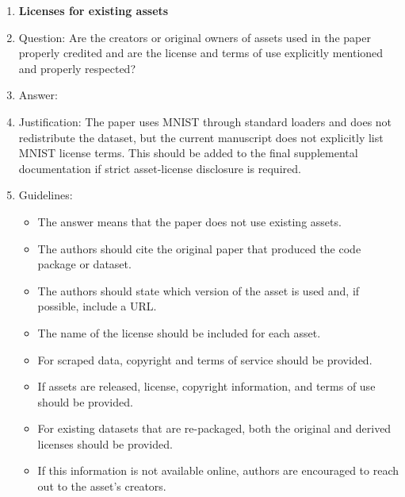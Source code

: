 \documentclass{article}
\begin{document}
\begin{enumerate}[leftmargin=1.5em]
\item {\bf Licenses for existing assets}
    \item[] Question: Are the creators or original owners of assets used in the paper properly credited and are the license and terms of use explicitly mentioned and properly respected?
    \item[] Answer: \answerNo{}
    \item[] Justification: The paper uses MNIST through standard loaders and does not redistribute the dataset, but the current manuscript does not explicitly list MNIST license terms. This should be added to the final supplemental documentation if strict asset-license disclosure is required.
    \item[] Guidelines:
    \begin{itemize}
        \item The answer \answerNA{} means that the paper does not use existing assets.
        \item The authors should cite the original paper that produced the code package or dataset.
        \item The authors should state which version of the asset is used and, if possible, include a URL.
        \item The name of the license should be included for each asset.
        \item For scraped data, copyright and terms of service should be provided.
        \item If assets are released, license, copyright information, and terms of use should be provided.
        \item For existing datasets that are re-packaged, both the original and derived licenses should be provided.
        \item If this information is not available online, authors are encouraged to reach out to the asset's creators.
    \end{itemize}


\end{enumerate}
\end{document}
